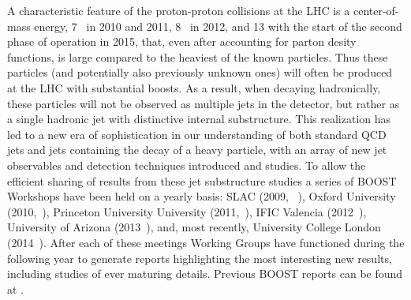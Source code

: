 A characteristic feature of the proton-proton collisions at the LHC is a center-of-mass energy, 7~\tev{} in 2010 and 2011, 8~\tev{} in 2012, and 13\tev{} with the start of the second phase of operation in 2015, that, even after accounting for parton desity functions, is large
compared to the heaviest of the known particles.  
Thus these particles (and potentially also previously unknown ones)
will often be produced at the LHC with
substantial boosts.  As a result, when decaying hadronically, these particles will not be observed as multiple jets in the detector, but rather
as a single hadronic jet with distinctive internal substructure.  This realization has led to a new era of sophistication
in our understanding of  both standard QCD jets and jets containing the decay of a heavy particle, with an array
of new jet observables and detection techniques introduced and studies.  To allow the efficient sharing of 
results from these jet substructure studies a series of BOOST Workshops have been held on a yearly basis:
SLAC (2009, ~\cite{Boost:2009xx}), 
Oxford University (2010,~\cite{Boost:2010xx}), Princeton 
University University (2011,~\cite{Boost:2011xx}),  IFIC Valencia (2012~\cite{Boost:2012xx}), 
University of Arizona (2013~\cite{Boost:2013xx}), and, most recently, University College London (2014~\cite{Boost:2014xx}).
After each of these meetings Working Groups have functioned during the following year to generate reports
highlighting the most interesting new results, including studies of ever maturing details.   Previous BOOST reports
can be found at \cite{Abdesselam:2010pt,Altheimer:2012mn,Altheimer:2013yza}.

